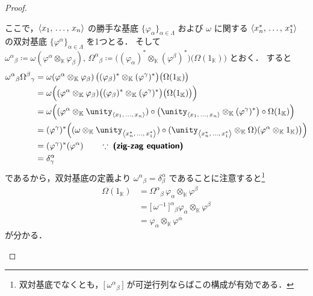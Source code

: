 \documentclass[TQFT_main]{subfiles}
\begin{document}
\begin{proof}
\begin{enumerate}
        ここで，$\expval{x_1,\, \dots,\, x_n}$ の勝手な基底 $\{\varphi_{\alpha}\}_{\alpha \in \Lambda}$ および $\omega$ に関する $\expval{x_n^*,\, \dots,\, x_1^*}$ の双対基底 $\{\varphi^{\alpha}\}_{\alpha \in \Lambda}$ を1つとる．
        そして $\omega^\alpha{}_\beta \coloneqq \omega (\varphi^\alpha \otimes_{\mathbb{K}} \varphi_\beta),\, \Omega^\alpha{}_\beta \coloneqq \bigl((\varphi_\alpha)^* \otimes_{\mathbb{K}} (\varphi^\beta)^*\bigr) \bigl( \Omega(1_{\mathbb{K}}) \bigr)$ とおく．
        すると
        \begin{align}
            \omega^\alpha{}_\beta \Omega^\beta{}_\gamma
            &= \omega (\varphi^\alpha \otimes_{\mathbb{K}} \varphi_\beta) \, \bigl((\varphi_\beta)^* \otimes_{\mathbb{K}} (\varphi^\gamma)^*\bigr) \bigl( \Omega(1_{\mathbb{K}}) \bigr) \\
            &= \omega \Bigl((\varphi^\alpha \otimes_{\mathbb{K}} \varphi_\beta) \bigl( (\varphi_\beta)^* \otimes_{\mathbb{K}} (\varphi^\gamma)^*\bigr) \bigl( \Omega(1_{\mathbb{K}}) \bigr) \Bigr) \\
            &= \omega \Bigl((\varphi^\alpha \otimes_{\mathbb{K}} \unity_{\expval{x_1,\, \dots,\, x_n}}) \circ \bigl(\unity_{\expval{x_1,\, \dots,\, x_n}} \otimes_{\mathbb{K}} (\varphi^\gamma)^* \bigr) \circ \Omega(1_{\mathbb{K}}) \Bigr) \\
            &= (\varphi^\gamma)^* \Bigl( (\omega \otimes_{\mathbb{K}} \unity_{\expval{x_n^*,\, \dots,\, x_1^*}} ) \circ (\unity_{\expval{x_n^*,\, \dots,\, x_1^*}} \otimes_{\mathbb{K}} \Omega) (\varphi^\alpha \otimes_{\mathbb{K}} 1_{\mathbb{K}}) \bigr) \Bigr) \\
            &= (\varphi^\gamma)^* (\varphi^\alpha) \qquad \because\; \text{\textsf{\textbf{(zig-zag equation)}}} \\
            &= \delta_\gamma^\alpha
        \end{align}
        であるから，双対基底の定義より $\omega^\alpha{}_\beta = \delta^{\alpha}_\beta$ であることに注意すると\footnote{双対基底でなくとも，$\bigl[\, \omega^{\alpha}{}_\beta \,\bigr]$ が可逆行列ならばこの構成が有効である．}
        \begin{align}
            \Omega(1_{\mathbb{K}}) 
            &= \Omega^\alpha{}_\beta\, \varphi_\alpha \otimes_{\mathbb{K}} \varphi^\beta  \\
            &= \bigl[\,\omega^{-1}\,\bigr]^\alpha{}_\beta \varphi_\alpha \otimes_{\mathbb{K}} \varphi^\beta \\
            &= \varphi_\alpha \otimes_{\mathbb{K}} \varphi^\alpha
        \end{align}
        が分かる．
    \end{enumerate}
    
\end{proof}
\end{document}
